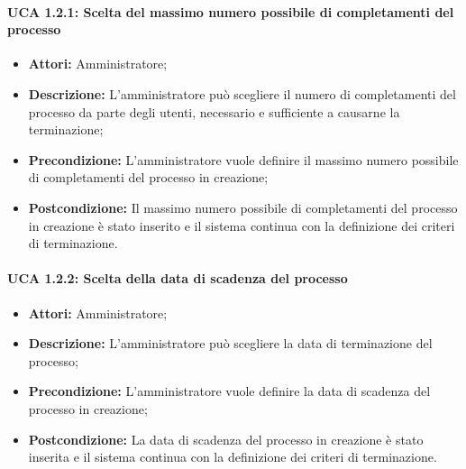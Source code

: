 \paragraph{UCA 1.2.1: Scelta del massimo numero possibile di completamenti del processo}
\begin{itemize}
\item \textbf{Attori:}
 Amministratore;
\item \textbf{Descrizione:}
 L'amministratore può scegliere il numero di completamenti del processo da parte degli utenti, necessario e sufficiente a causarne la terminazione;
\item \textbf{Precondizione:}
 L'amministratore vuole definire il massimo numero possibile di completamenti del processo in creazione;
\item \textbf{Postcondizione:} 
Il massimo numero possibile di completamenti del processo in creazione è stato inserito e il sistema continua con la definizione dei criteri di terminazione.
\end{itemize}

\paragraph{UCA 1.2.2: Scelta della data di scadenza del processo}
\begin{itemize}
\item \textbf{Attori:}
 Amministratore;
\item \textbf{Descrizione:}
 L'amministratore può scegliere la data di terminazione del processo;
\item \textbf{Precondizione:}
 L'amministratore vuole definire la data di scadenza del processo in creazione;
\item \textbf{Postcondizione:}
 La data di scadenza del processo in creazione è stato inserita e il sistema continua con la definizione dei criteri di terminazione.
\end{itemize}

